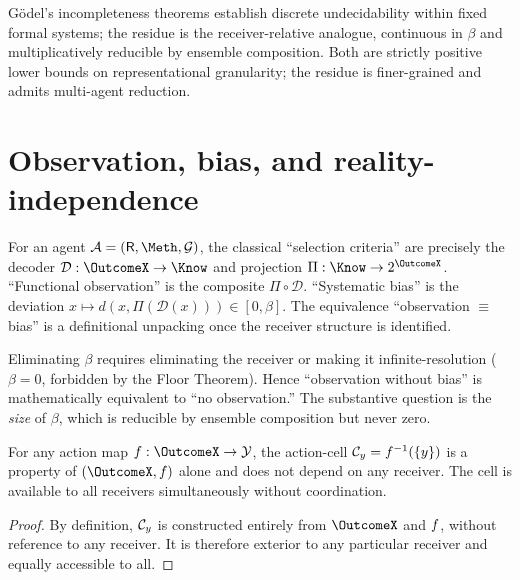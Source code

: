 Gödel's incompleteness theorems \citep{godel1931} establish discrete
undecidability within fixed formal systems; the residue is the
receiver-relative analogue, continuous in $\beta$ and multiplicatively
reducible by ensemble composition. Both are strictly positive lower bounds
on representational granularity; the residue is finer-grained and admits
multi-agent reduction.

\section{Observation, bias, and reality-independence}
\label{sec:ch03-bias}

\begin{theorem}\label{thm:bias-decoder}
For an agent $\agent=(\receiver,\Meth,\Goal)$, the classical ``selection
criteria'' are precisely the decoder $\mathcal{D}:\OutcomeX\to\Know$ and
projection $\Pi:\Know\to 2^{\OutcomeX}$. ``Functional observation'' is the
composite $\Pi\circ\mathcal{D}$. ``Systematic bias'' is the deviation
$x\mapsto d(x,\Pi(\mathcal{D}(x)))\in[0,\beta]$. The equivalence
``observation $\equiv$ bias'' is a definitional unpacking once the receiver
structure is identified.
\end{theorem}

\begin{corollary}
\label{cor:no-elim}
Eliminating $\beta$ requires eliminating the receiver or making it
infinite-resolution ($\beta=0$, forbidden by the Floor Theorem). Hence
``observation without bias'' is mathematically equivalent to ``no
observation.'' The substantive question is the \emph{size} of $\beta$,
which is reducible by ensemble composition but never zero.
\end{corollary}

\begin{theorem}\label{thm:exterior}
For any action map $\ActionMap:\OutcomeX\to\ActionSp$, the action-cell
$\mathcal{C}_y=f^{-1}(\{y\})$ is a property of $(\OutcomeX,\ActionMap)$
alone and does not depend on any receiver. The cell is available to all
receivers simultaneously without coordination.
\end{theorem}

\begin{proof}
By definition, $\mathcal{C}_y$ is constructed entirely from $\OutcomeX$ and
$f$, without reference to any receiver. It is therefore exterior
to any particular receiver and equally accessible to all.
\end{proof}


